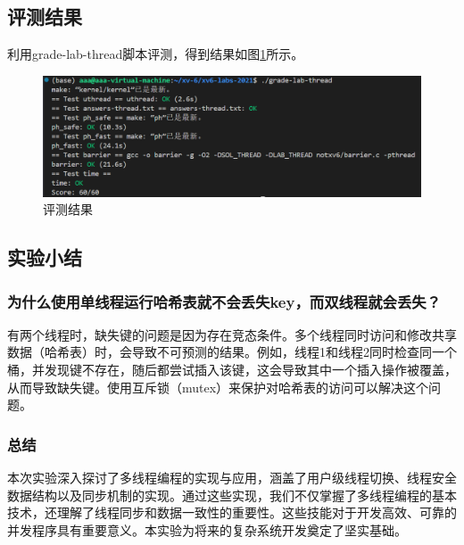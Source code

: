 \subsection{评测结果}
利用grade-lab-thread脚本评测，得到结果如图\ref{fig:thread}所示。
\begin{figure}[h]
    \centering
    \includegraphics[width=\linewidth]{pics/thread评测结果.png}
    \caption{评测结果}
    \label{fig:thread}
\end{figure}

\subsection{实验小结}

\subsubsection*{为什么使用单线程运行哈希表就不会丢失key，而双线程就会丢失？}
有两个线程时，缺失键的问题是因为存在竞态条件。多个线程同时访问和修改共享数据（哈希表）时，会导致不可预测的结果。例如，线程1和线程2同时检查同一个桶，并发现键不存在，随后都尝试插入该键，这会导致其中一个插入操作被覆盖，从而导致缺失键。使用互斥锁（mutex）来保护对哈希表的访问可以解决这个问题。
\subsubsection*{总结}
本次实验深入探讨了多线程编程的实现与应用，涵盖了用户级线程切换、线程安全数据结构以及同步机制的实现。通过这些实现，我们不仅掌握了多线程编程的基本技术，还理解了线程同步和数据一致性的重要性。这些技能对于开发高效、可靠的并发程序具有重要意义。本实验为将来的复杂系统开发奠定了坚实基础。